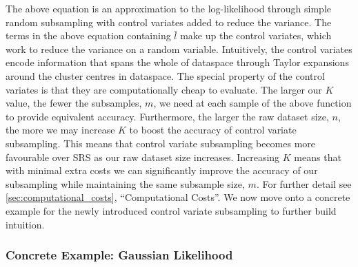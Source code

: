 The above equation is an approximation to the log-likelihood through simple random subsampling with control variates added to reduce the variance. The terms in the above equation containing $\bar{l}$ make up the control variates, which work to reduce the variance on a random variable. Intuitively, the control variates encode information that spans the whole of dataspace through Taylor expansions around the cluster centres in dataspace. The special property of the control variates is that they are computationally cheap to evaluate. The larger our $K$ value, the fewer the subsamples, $m$, we need at each sample of the above function to provide equivalent accuracy. Furthermore, the larger the raw dataset size, $n$, the more we may increase $K$ to boost the accuracy of control variate subsampling. This means that control variate subsampling becomes more favourable over SRS as our raw dataset size increases. Increasing $K$ means that with minimal extra costs we can significantly improve the accuracy of our subsampling while maintaining the same subsample size, $m$. For further detail see \cref{sec:computational_costs}, ``Computational Costs''. We now move onto a concrete example for the newly introduced control variate subsampling to further build intuition.


\subsubsection{Concrete Example: Gaussian Likelihood}


